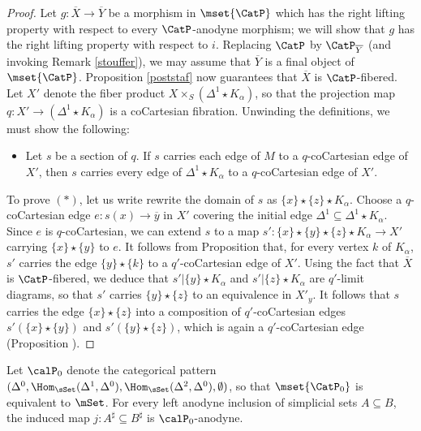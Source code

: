\begin{proof}
Let $g: \overline{X} \rightarrow \overline{Y}$ be a morphism in $\mset{ \CatP}$ which has
the right lifting property with respect to every $\CatP$-anodyne morphism; we will show that
$g$ has the right lifting property with respect to $i$. Replacing $\CatP$ by $\CatP_{ \overline{Y} }$
(and invoking Remark \ref{stouffer}), we may assume that $\overline{Y}$ is a final object of
$\mset{ \CatP}$. Proposition \ref{poststaf} now guarantees that $\overline{X}$ is $\CatP$-fibered.
Let $X'$ denote the fiber product $X \times_{S} ( \Delta^1 \star K_{\alpha})$, so that the projection
map $q: X' \rightarrow ( \Delta^1 \star K_{\alpha})$ is a coCartesian fibration. Unwinding the definitions, we must show the following:
\begin{itemize}
\item[$(\ast)$] Let $s$ be a section of $q$. If $s$ carries each edge of $M$ to a $q$-coCartesian edge
of $X'$, then $s$ carries every edge of $\Delta^1 \star K_{\alpha}$ to a $q$-coCartesian edge of $X'$.
\end{itemize}
To prove $(\ast)$, let us write rewrite the domain of $s$ as $\{x\} \star \{z\} \star K_{\alpha}$.
Choose a $q$-coCartesian edge $e: s(x) \rightarrow \overline{y}$ in $X'$ covering the initial edge
$\Delta^1 \subseteq \Delta^1 \star K_{\alpha}$. Since $e$ is $q$-coCartesian, we can extend
$s$ to a map $s': \{x\} \star \{y\} \star \{z\}  \star K_{\alpha} \rightarrow X'$ carrying
$\{x\} \star \{y\}$ to $e$. It follows from Proposition
 that, for every vertex $k$ of $K_{\alpha}$, $s'$ carries the edge
$\{y\} \star \{k\}$ to a $q'$-coCartesian edge of $X'$. Using the fact that
$\overline{X}$ is $\CatP$-fibered, we deduce that $s' | \{y\} \star K_{\alpha}$ and
$s' | \{z\} \star K_{\alpha}$ are $q'$-limit diagrams, so that $s'$ carries $\{y\} \star \{z\}$ to
an equivalence in $X'_{y}$. It follows that $s$ carries the edge $\{x\} \star \{z\}$ into a 
composition of $q'$-coCartesian edges $s'( \{x\} \star \{y\})$ and $s'( \{y\} \star \{z\})$, 
which is again a $q'$-coCartesian edge (Proposition ).
\end{proof}

\begin{lemma}\label{kalel}
Let $\calP_0$ denote the categorical pattern $( \Delta^0, \Hom_{\sSet}(\Delta^1, \Delta^0), \Hom_{\sSet}(\Delta^2, \Delta^0), \emptyset)$, so that $\mset{ \CatP_0}$ is equivalent to $\mSet$. For every left anodyne inclusion of simplicial sets $A \subseteq B$, the induced map $j: A^{\sharp} \subseteq B^{\sharp}$ is $\calP_0$-anodyne.
\end{lemma}

